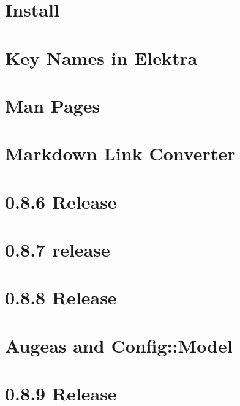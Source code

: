 \let\mypdfximage\pdfximage\def\pdfximage{\immediate\mypdfximage}\documentclass[twoside]{book}
\newcommand{\+}{\discretionary{\mbox{\scriptsize$\hookleftarrow$}}{}{}}
\begin{document}
\chapter{Install}
\label{doc_INSTALL_md}

\chapter{Key Names in Elektra}
\label{doc_KEYNAMES_md}

\chapter{Man Pages}
\label{doc_man_README_md}

\chapter{Markdown Link Converter}
\label{doc_markdownlinkconverter_README_md}

\chapter{0.8.6 Release}
\label{doc_news_2014-06-21_0_8_6_md}

\chapter{0.8.7 release}
\label{doc_news_2014-07-28_0_8_7_md}

\chapter{0.8.8 Release}
\label{doc_news_2014-09-02_0_8_8_md}

\chapter{Augeas and Config\+::Model}
\label{doc_news_2014-10-22_augeas_md}

\chapter{0.8.9 Release}
\label{doc_news_2014-11-04_0_8_9_md}

\end{document}
